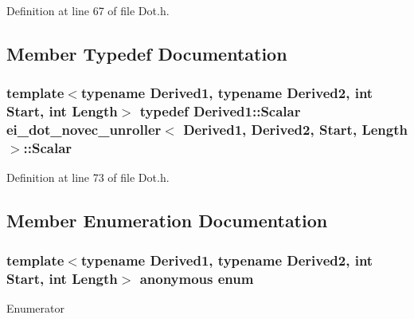 Definition at line 67 of file Dot.\-h.



\subsection{Member Typedef Documentation}
\hypertarget{structei__dot__novec__unroller_a65460ac5d9069e7849e735000eacba50}{
\subsubsection[{Scalar}]{\setlength{\rightskip}{0pt plus 5cm}template$<$typename Derived1, typename Derived2, int Start, int Length$>$ typedef Derived1\-::\-Scalar {\bf ei\-\_\-dot\-\_\-novec\-\_\-unroller}$<$ Derived1, Derived2, Start, Length $>$\-::{\bf Scalar}}}\label{structei__dot__novec__unroller_a65460ac5d9069e7849e735000eacba50}


Definition at line 73 of file Dot.\-h.



\subsection{Member Enumeration Documentation}
\hypertarget{structei__dot__novec__unroller_a64d152ec95cf1a8b02aaaa1268bfeedd}{\subsubsection[{anonymous enum}]{\setlength{\rightskip}{0pt plus 5cm}template$<$typename Derived1, typename Derived2, int Start, int Length$>$ anonymous enum}}\label{structei__dot__novec__unroller_a64d152ec95cf1a8b02aaaa1268bfeedd}
\begin{Desc}
\item[Enumerator]\par
\begin{description}
\item[{\em 
\hypertarget{structei__dot__novec__unroller_a64d152ec95cf1a8b02aaaa1268bfeeddac378a795cc02381a251bcf6a811d4afe}{Half\-Length}\label{structei__dot__novec__unroller_a64d152ec95cf1a8b02aaaa1268bfeeddac378a795cc02381a251bcf6a811d4afe}
}]\end{description}
\end{Desc}


